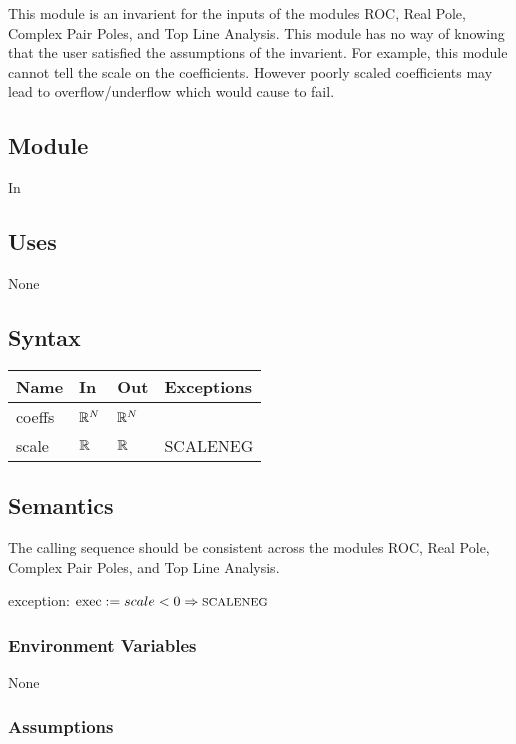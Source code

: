 \documentclass[12pt, titlepage]{article}
\begin{document}
This module is an invarient for the inputs of the modules
ROC, Real Pole, Complex Pair Poles, and Top Line Analysis. This module
has no way of knowing that the user satisfied the assumptions of the invarient.
For example, this module cannot tell the scale on the coefficients.
However poorly scaled coefficients may lead to overflow/underflow which would
cause  to fail.

\subsection{Module}

In

\subsection{Uses}

None

\subsection{Syntax}

\begin{tabular}{p{3cm} p{2cm} p{4cm} >{\raggedright\arraybackslash}p{9cm}}
\toprule
\textbf{Name} & \textbf{In} & \textbf{Out} & \textbf{Exceptions} \\
\midrule
  coeffs & $\mathbb{R}^N$ & $\mathbb{R}^N$ &  \\
  scale  & $\mathbb{R}$ & $\mathbb{R}$ &  {\footnotesize SCALENEG} \\
\bottomrule
\end{tabular}

\subsection{Semantics}

The calling sequence should be consistent across the modules
ROC, Real Pole, Complex Pair Poles, and Top Line Analysis.

exception: $\text{exec} := scale < 0 \Rightarrow \text{\footnotesize SCALENEG}$

\subsubsection{Environment Variables}

None

\subsubsection{Assumptions}
\end{document}
